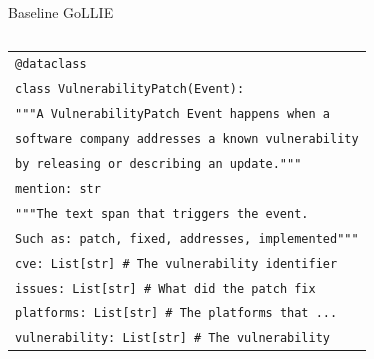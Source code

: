 \documentclass[
    11pt,
    notheorems,
    xcolor={dvipsnames},
    hyperref={
        pdfstartview=FitH, 
        pdftitle={Ikasketa-adibide urriko Informazio-Erauzketa}, 
        pdfauthor={Oscar Sainz Jimenez}, 
        citecolor=secondary, 
    }
]{beamer}
\begin{document}
\begin{frame}
\begin{block}{Baseline \hspace{14.5em}GoLLIE}
\begin{columns}[t]
\begin{column}{0.58\textwidth}
                \begin{table}
                    \vspace{-3.5em}
                    \begin{tabular}{p{\textwidth}}
                        \texttt{\small\textcolor{github-purple}{@dataclass}}                                                                              \\
                        \texttt{\small\textcolor{github-red}{class} \textcolor{github-dark-red}{VulnerabilityPatch}(\textcolor{github-dark-red}{Event}):} \\
                        \texttt{\small\textcolor{github-blue}{\quad """A VulnerabilityPatch Event happens when a}}                                        \\
                        \texttt{\small\textcolor{github-blue}{\quad software company addresses a known vulnerability}}                                    \\
                        \texttt{\small\textcolor{github-blue}{\quad by releasing or describing an update."""}}                                            \\
                        \texttt{\small\quad mention: str}                                                                                                 \\
                        \texttt{\small\textcolor{github-blue}{\quad """The text span that triggers the event.}}                                           \\
                        \texttt{\small\textcolor{github-blue}{\quad Such as: patch, fixed, addresses, implemented"""}}                                    \\
                        \texttt{\small\quad cve: \textcolor{github-dark-red}{List}[str] \textcolor{github-gray}{\# The vulnerability identifier}}         \\
                        \texttt{\small\quad issues: \textcolor{github-dark-red}{List}[str] \textcolor{github-gray}{\# What did the patch fix}}            \\
                        \texttt{\small\quad platforms: \textcolor{github-dark-red}{List}[str] \textcolor{github-gray}{\# The platforms that ...}}         \\
                        \texttt{\small\quad vulnerability: \textcolor{github-dark-red}{List}[str] \textcolor{github-gray}{\# The vulnerability}}          \\

\end{tabular}
\end{table}
\end{column}
\end{columns}
\end{block}
\end{frame}
\end{document}
